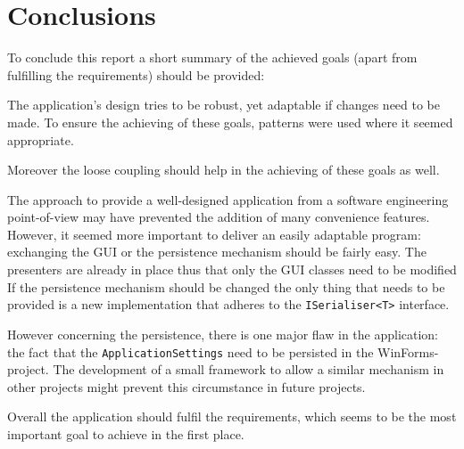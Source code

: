 \chapter{Conclusions}\label{ch:conclusions} %

To conclude this report a short summary of the achieved goals (apart from fulfilling the requirements) should be provided:

The application's design tries to be robust, yet adaptable if changes need to be made.
To ensure the achieving of these goals, patterns were used where it seemed appropriate.

Moreover the loose coupling should help in the achieving of these goals as well.

The approach to provide a well-designed application from a software engineering point-of-view may  have prevented the addition of many convenience features. However, it seemed more important to deliver an easily adaptable program: exchanging the \ac{GUI} or the persistence mechanism should be fairly easy.
The presenters are already in place thus that only the \ac{GUI} classes need to be modified
If the persistence mechanism should be changed the only thing that needs to be provided is a new implementation that adheres to the \texttt{ISerialiser<T>} interface.

However concerning the persistence, there is one major flaw in the application: the fact that the \texttt{ApplicationSettings} need to be persisted in the WinForms-project. 
The development of a small framework to allow a similar mechanism in other projects might prevent this circumstance in future projects.

Overall the application should fulfil the requirements, which seems to be the most important goal to achieve in the first place.